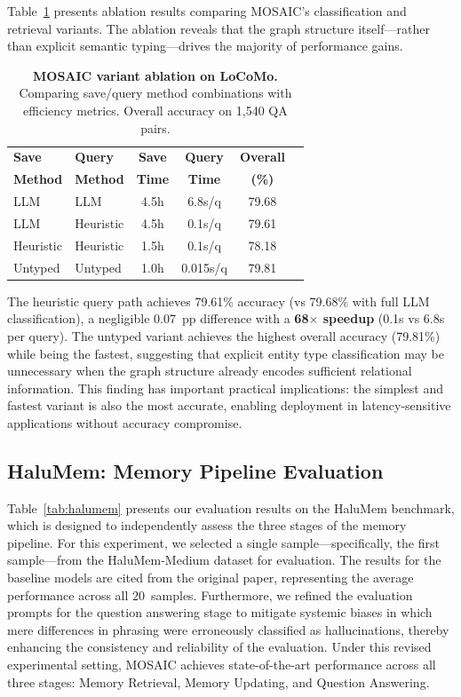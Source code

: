 \documentclass[10pt,twocolumn]{article}
\begin{document}
Table~\ref{tab:ablation} presents ablation results comparing MOSAIC's
classification and retrieval variants. The ablation reveals that the graph
structure itself---rather than explicit semantic typing---drives the majority
of performance gains.

\begin{table}[!t]
\centering
\caption{\textbf{MOSAIC variant ablation on LoCoMo.} Comparing
save/query method combinations with efficiency metrics. Overall accuracy
on 1,540 QA pairs.}
\label{tab:ablation}
\small
\setlength{\tabcolsep}{2.5pt}
\begin{tabular}{@{}llcccc@{}}
\toprule
\textbf{Save} & \textbf{Query} & \textbf{Save} & \textbf{Query} & \textbf{Overall} \\
\textbf{Method} & \textbf{Method} & \textbf{Time} & \textbf{Time} & \textbf{(\%)} \\
\midrule
LLM & LLM & 4.5h & 6.8s/q & 79.68 \\
LLM & Heuristic & 4.5h & 0.1s/q & 79.61 \\
Heuristic & Heuristic & 1.5h & 0.1s/q & 78.18 \\
Untyped & Untyped & 1.0h & 0.015s/q & 79.81 \\
\bottomrule
\end{tabular}
\end{table}

The heuristic query path achieves 79.61\% accuracy (vs 79.68\% with
full LLM classification), a negligible 0.07~pp difference with a
\textbf{68$\times$ speedup} (0.1s vs 6.8s per query). The untyped variant
achieves the highest overall accuracy (79.81\%) while being the fastest,
suggesting that explicit entity type classification may be unnecessary when
the graph structure already encodes sufficient relational information. This
finding has important practical implications: the simplest and fastest
variant is also the most accurate, enabling deployment in latency-sensitive
applications without accuracy compromise.

\subsection{HaluMem: Memory Pipeline Evaluation}
\label{sec:results_halumem}

Table~\ref{tab:halumem} presents our evaluation results on the HaluMem
benchmark, which is designed to independently assess the three stages of the
memory pipeline. For this experiment, we selected a single
sample---specifically, the first sample---from the HaluMem-Medium dataset
for evaluation. The results for the baseline models are cited from the
original paper, representing the average performance across all
20~samples. Furthermore, we refined the evaluation prompts for the question
answering stage to mitigate systemic biases in which mere differences in
phrasing were erroneously classified as hallucinations, thereby enhancing
the consistency and reliability of the evaluation. Under this revised
experimental setting, MOSAIC achieves state-of-the-art performance across
all three stages: Memory Retrieval, Memory Updating, and Question Answering.
\end{document}
